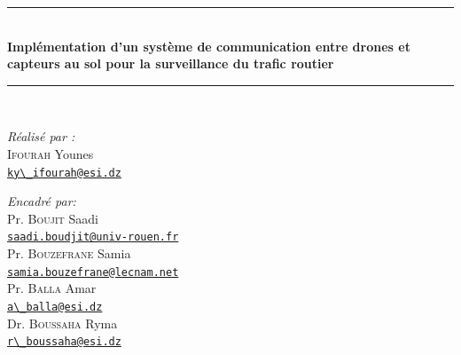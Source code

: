 {\begin{titlepage}
    \rule{\linewidth}{0.3mm} \\[0.4cm]
    {
    \Large \bfseries
    Implémentation d'un système de communication entre drones et capteurs au sol pour la surveillance du trafic routier\\
    }
    \rule{\linewidth}{0.3mm} \\[1cm]

    \vspace{10mm}

    \noindent
    \begin{minipage}{0.6\textwidth}
      \vspace{-7mm}
      \begin{flushleft} \large
        \emph{Réalisé par :}\\
        \textsc{Ifourah} Younes \\
        \href{mailto:ky_ifourah@esi.dz}{\verb!ky\_ifourah@esi.dz!}
      \end{flushleft}
    \end{minipage}
    \begin{minipage}{0.35\textwidth}
      \begin{flushright} \large
        \begin{flushleft} \large
          \emph{Encadré par:} \\
          {
          Pr. \textsc{Boujit} Saadi\\[0.1cm]
          \href{mailto:saadi.boudjit@univ-rouen.fr}{\verb!saadi.boudjit@univ-rouen.fr!}\\[0.1cm]
          Pr. \textsc{Bouzefrane} Samia\\[0.1cm]
          \href{mailto:samia.bouzefrane@lecnam.net}{\verb!samia.bouzefrane@lecnam.net!}\\[0.1cm]
          Pr. \textsc{Balla} Amar\\[0.1cm]
          \href{mailto:a_balla@esi.dz}{\verb!a\_balla@esi.dz!}\\
          Dr. \textsc{Boussaha} Ryma\\[0.1cm]
          \href{mailto:r_boussaha@esi.dz}{\verb!r\_boussaha@esi.dz!}\\
          }
        \end{flushleft}
      \end{flushright}
    \end{minipage}\\[1cm]


\end{titlepage}}
